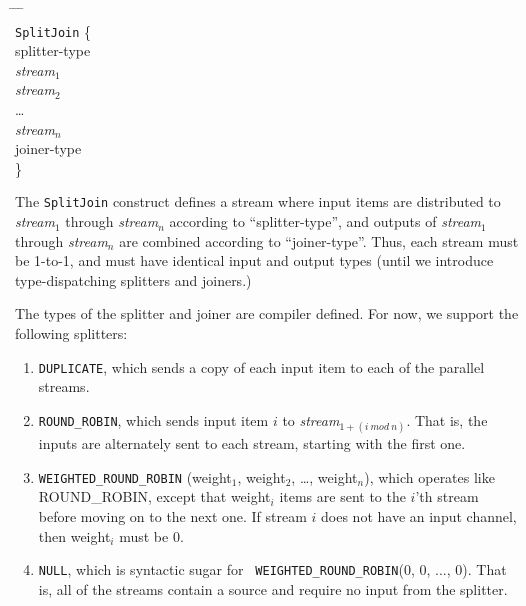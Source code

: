\begin{tabbing}
\hspace{0.2in} \= \hspace{0.2in} \= \hspace{0.2in} \= \hspace{0.2in} \= \\
{\tt SplitJoin} \{ \\
\> splitter-type \\
\> {\it stream$_1$} \\
\> {\it stream$_2$} \\
\> \dots \\
\> {\it stream$_n$} \\
\> joiner-type \\
\}
\end{tabbing}

The {\tt SplitJoin} construct defines a stream where input items are
distributed to {\it stream$_1$} through {\it stream$_n$} according to
``splitter-type'', and outputs of {\it stream$_1$} through {\it
stream$_n$} are combined according to ``joiner-type''.  Thus, each
stream must be 1-to-1, and must have identical input and output types
(until we introduce type-dispatching splitters and joiners.)

The types of the splitter and joiner are compiler defined.  For now,
we support the following splitters:

\begin{enumerate}

\item {\tt DUPLICATE}, which sends a copy of each input item to each
of the parallel streams.

\item {\tt ROUND\_ROBIN}, which sends input item $i$ to {\it
stream$_{1+(i~mod~n)}$}.  That is, the inputs are alternately sent to
each stream, starting with the first one.

\item {\tt WEIGHTED\_ROUND\_ROBIN} (weight$_1$, weight$_2$, \dots,
weight$_n$), which operates like ROUND\_ROBIN, except that weight$_i$
items are sent to the $i$'th stream before moving on to the next one.
If stream $i$ does not have an input channel, then weight$_i$ must be
0.

\item {\tt NULL}, which is syntactic sugar for {\tt
WEIGHTED\_ROUND\_ROBIN}(0, 0, ..., 0).  That is, all of the streams
contain a source and require no input from the splitter.

\end{enumerate}


